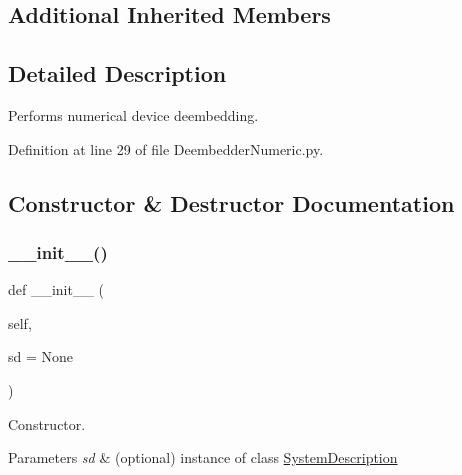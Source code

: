\subsection*{Additional Inherited Members}


\subsection{Detailed Description}
Performs numerical device deembedding. 

Definition at line 29 of file Deembedder\+Numeric.\+py.



\subsection{Constructor \& Destructor Documentation}
\mbox{\label{classSignalIntegrity_1_1SystemDescriptions_1_1DeembedderNumeric_1_1DeembedderNumeric_a2fa2ae61a4511a760e2d2047ec07eb05}} 
\subsubsection{\texorpdfstring{\+\_\+\+\_\+init\+\_\+\+\_\+()}{\_\_init\_\_()}}
{\footnotesize\ttfamily def \+\_\+\+\_\+init\+\_\+\+\_\+ (\begin{DoxyParamCaption}\item[{}]{self,  }\item[{}]{sd = {\ttfamily None} }\end{DoxyParamCaption})}



Constructor. 


\begin{DoxyParams}{Parameters}
{\em sd} & (optional) instance of class \hyperlink{namespaceSignalIntegrity_1_1SystemDescriptions_1_1SystemDescription}{System\+Description} \\
\hline
\end{DoxyParams}


